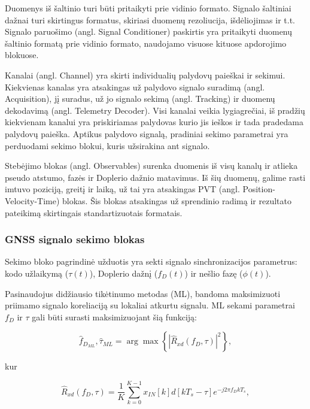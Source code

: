\documentclass[main.tex]{subfiles}
\begin{document}
Duomenys iš šaltinio turi būti pritaikyti prie vidinio formato. Signalo šaltiniai
dažnai turi skirtingus formatus, skiriasi duomenų rezoliucija, išdėliojimas ir t.t.
Signalo paruošimo (angl. Signal Conditioner) paskirtis yra pritaikyti duomenų šaltinio
formatą prie vidinio formato, naudojamo visuose kituose apdorojimo blokuose.

Kanalai (angl. Channel) yra skirti individualių palydovų paieškai ir sekimui.
Kiekvienas kanalas yra atsakingas už palydovo signalo suradimą (angl. Acquisition),
jį suradus, už jo signalo sekimą (angl. Tracking) ir duomenų dekodavimą (angl. Telemetry
Decoder). Visi kanalai veikia lygiagrečiai, iš pradžių kiekvienam kanalui yra
priskiriamas palydovas kurio jis ieškos ir tada pradedama palydovų paieška.
Aptikus palydovo signalą, pradiniai sekimo parametrai yra perduodami sekimo
blokui, kuris užsirakina ant signalo.

Stebėjimo blokas (angl. Observables) surenka duomenis iš visų kanalų ir atlieka
pseudo atstumo, fazės ir Doplerio dažnio matavimus. Iš šių duomenų, galime
rasti imtuvo poziciją, greitį ir laiką, už tai yra atsakingas PVT
(angl. Position-Velocity-Time) blokas. Šis blokas atsakingas už sprendinio
radimą ir rezultato pateikimą skirtingais standartizuotais formatais.

\subsubsection{GNSS signalo sekimo blokas}\label{sec:tracking_block}

Sekimo bloko pagrindinė užduotis yra sekti signalo sinchronizacijos parametrus:
kodo užlaikymą ($\tau(t)$), Doplerio dažnį ($f_D(t)$) ir nešlio fazę ($\phi(t)$).

Pasinaudojus didžiausio tikėtinumo metodas (ML), bandoma maksimizuoti priimamo
signalo koreliaciją su lokaliai atkurtu signalu. ML sekami parametrai $f_D$ ir
$\tau$ gali būti surasti maksimizuojant šią funkciją:

\begin{equation}
    \hat{f}_{D_{ML}},\hat{\tau}_{ML} = \arg \max \left\{ \left| \hat{R}_{xd}(f_D, \tau) \right|^2 \right\},
\end{equation}

\noindent kur

\begin{equation}
    \hat{R}_{xd}(f_D, \tau) = \frac{1}{K} \sum^{K-1}_{k=0} {x_{IN}[k]d[kT_s-\tau]e^{-j2\pi f_D kT_s}},
\end{equation}
\end{document}
